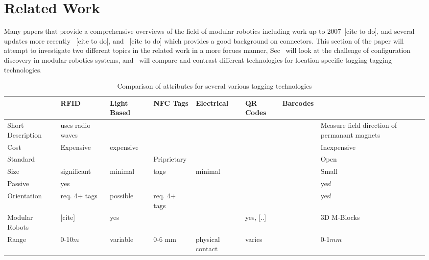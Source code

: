 \section{Related Work}
\label{sec:RelatedWork}

Many papers that provide a comprehensive overviews of the field of modular robotics including work up to 2007~[cite to do], and several updates more recently ~[cite to do], and ~[cite to do] which provides a good background on connectors. This section of the paper will attempt to investigate two different topics in the related work in a more focues manner, Sec~\label{sec:RWconfiguration} will look at the challenge of configuration discovery in modular robotics systems, and~\label{sec:RWtaggingTech} will compare and contrast different technologies for location specific tagging tagging technologies.

\begin{table*}[t]
	\centering
	\caption{Comparison of attributes for several various tagging technologies}
	\newcommand{\wdd}{1.8cm}
	\begin{tabular}{ p{\wdd} |p{\wdd}  p{\wdd} p{\wdd} p{\wdd} p{\wdd} p{\wdd} p{\wdd}  }
		\hline
		& RFID 				%
		& Light Based		%
		& NFC Tags 			%
		& Electrical 		%
		& QR Codes 			%
		& Barcodes			%
		& \tagNamePlural \\ %
		\hline
		Short Description		& uses radio waves	& 			& 			& 					& 			& 	  	& Measure field direction of permanant magnets \\
		
		Cost			& Expensive	& expensive	& 			& 					& 			& 	  	& Inexpensive \\
		Standard		& 			&  			& Priprietary	& 					& 			& 	  						& Open \\
		Size 			& significant & minimal & tags  	& minimal	  				&       	&     	& Small		  \\
		Passive 		& yes		& 			&  			&	 				&			& 		& yes!		  \\
		Orientation 	& req. 4+ tags 		& possible 	& req. 4+ tags 	&	 				&	  		& 		& yes!		\\
		Modular Robots 	& [cite]	& yes		&	  		&					& yes, [..]	& 		& 3D M-Blocks\\
		Range			& 0-10$m$	& variable	& 0-6 mm	& physical contact	& varies	&		& 0-1$mm$	\\
	\end{tabular}	
	\label{tab:tagTech}    
\end{table*}

